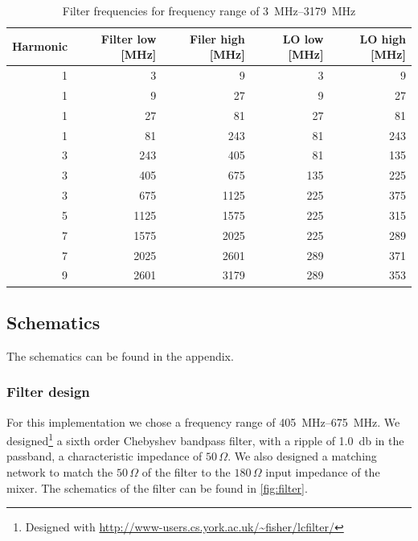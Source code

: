 \documentclass[a4paper, openany, oneside]{memoir}
\begin{document}
\begin{table}[h]
\centering
\caption{Filter frequencies for frequency range of \SIrange{3}{3179}{\mega\hertz}}
\label{tbl:filter_freqs}
\begin{tabular}{rrrrr}
\toprule
   Harmonic &   Filter low [\si{\mega\hertz}] &   Filer high [\si{\mega\hertz}] &   LO low [\si{\mega\hertz}] &   LO high [\si{\mega\hertz}] \\
\midrule
          1 &            3 &            9 &        3 &         9 \\
          1 &            9 &           27 &        9 &        27 \\
          1 &           27 &           81 &       27 &        81 \\
          1 &           81 &          243 &       81 &       243 \\
          3 &          243 &          405 &       81 &       135 \\
          3 &          405 &          675 &      135 &       225 \\
          3 &          675 &         1125 &      225 &       375 \\
          5 &         1125 &         1575 &      225 &       315 \\
          7 &         1575 &         2025 &      225 &       289 \\
          7 &         2025 &         2601 &      289 &       371 \\
          9 &         2601 &         3179 &      289 &       353 \\
\bottomrule
\end{tabular}
\end{table}

\subsection{Schematics}
The schematics can be found in the appendix.


\subsubsection{Filter design}
For this implementation we chose a frequency range of \SIrange{405}{675}{\mega\hertz}. We designed\footnote{Designed with \url{http://www-users.cs.york.ac.uk/~fisher/lcfilter/}} a sixth order Chebyshev bandpass filter, with a ripple of \SI{1.0}{\decibel} in the passband, a characteristic impedance of $50\,\Omega$. We also designed a matching network to match the $50\,\Omega$ of the filter to the $180\,\Omega$ input impedance of the mixer. The schematics of the filter can be found in \cref{fig:filter}.
\end{document}
